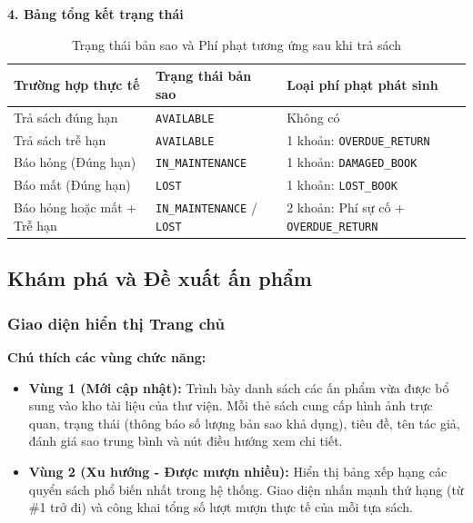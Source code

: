 \noindent\textbf{4. Bảng tổng kết trạng thái}
\begin{table}[H]
    \centering
    \caption{Trạng thái bản sao và Phí phạt tương ứng sau khi trả sách}
    \renewcommand{\arraystretch}{1.3}
    \begin{tabularx}{\textwidth}{|l|l|X|}
        \hline
        \textbf{Trường hợp thực tế} & \textbf{Trạng thái bản sao} & \textbf{Loại phí phạt phát sinh} \\ \hline
        Trả sách đúng hạn & \texttt{AVAILABLE} & Không có \\ \hline
        Trả sách trễ hạn & \texttt{AVAILABLE} & 1 khoản: \texttt{OVERDUE\_RETURN} \\ \hline
        Báo hỏng (Đúng hạn) & \texttt{IN\_MAINTENANCE} & 1 khoản: \texttt{DAMAGED\_BOOK} \\ \hline
        Báo mất (Đúng hạn) & \texttt{LOST} & 1 khoản: \texttt{LOST\_BOOK} \\ \hline
        Báo hỏng hoặc mất + Trễ hạn & \texttt{IN\_MAINTENANCE} / \texttt{LOST} & 2 khoản: Phí sự cố + \texttt{OVERDUE\_RETURN} \\ \hline
    \end{tabularx}
\end{table}


\subsection{Khám phá và Đề xuất ấn phẩm}

\subsubsection{Giao diện hiển thị Trang chủ}


\noindent\textbf{Chú thích các vùng chức năng:}
\begin{itemize}
    \item \textbf{Vùng 1 (Mới cập nhật):} Trình bày danh sách các ấn phẩm vừa được bổ sung vào kho tài liệu của thư viện. Mỗi thẻ sách cung cấp hình ảnh trực quan, trạng thái (thông báo số lượng bản sao khả dụng), tiêu đề, tên tác giả, đánh giá sao trung bình và nút điều hướng xem chi tiết.
    \item \textbf{Vùng 2 (Xu hướng - Được mượn nhiều):} Hiển thị bảng xếp hạng các quyển sách phổ biến nhất trong hệ thống. Giao diện nhấn mạnh thứ hạng (từ \#1 trở đi) và công khai tổng số lượt mượn thực tế của mỗi tựa sách.
\end{itemize}

